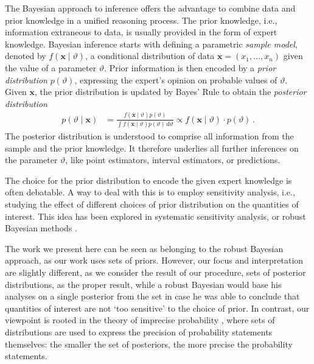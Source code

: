 \documentclass[runningheads,a4paper]{llncs}
\newcommand{\dd}{\,\mathrm{d}}
\renewcommand{\vec}[1]{{\bm #1}}
\begin{document}
The Bayesian approach to inference \cite{2007:robert,2005:ruggeri} %
offers the advantage to combine data and prior knowledge in a unified reasoning process.
The prior knowledge, i.e., information extraneous to data, is usually provided in the form of expert knowledge.
%
Bayesian inference starts with defining a parametric \emph{sample model},
denoted by $f(\vec{x} \mid \vartheta)$,
a conditional distribution of data $\vec{x} = (x_1, \ldots, x_n)$ given the value of a parameter $\vartheta$.
Prior information is then encoded by a \emph{prior distribution} $p(\vartheta)$,
expressing the expert's opinion on probable values of $\vartheta$.
Given $\vec{x}$, the prior distribution is updated by Bayes' Rule
to obtain the \emph{posterior distribution}
\begin{align}
\label{eq:bayesrule}
p(\vartheta\mid\vec{x}) &= \frac{f(\vec{x}\mid\vartheta) p(\vartheta)}{\int f(\vec{x}\mid\vartheta) p(\vartheta) \dd \vartheta}
                         \propto f(\vec{x}\mid\vartheta) \cdot p(\vartheta)\,.
\end{align}
The posterior distribution is understood to comprise all information from the sample and the prior knowledge.
It therefore underlies all further inferences on the parameter $\vartheta$,
like point estimators, interval estimators,
or predictions.

The choice for the prior distribution to encode the given expert knowledge is often debatable.
A way to deal with this is to employ sensitivity analysis,
i.e., studying the effect of different choices of prior distribution on the quantities of interest.
This idea has been explored in systematic sensitivity analysis, or robust Bayesian methods
\cite{1994:berger,2000:rios}. %

The work we present here can be seen as belonging to the robust Bayesian approach, as our work uses sets of priors.
However, our focus and interpretation are slightly different,
as we consider the result of our procedure, sets of posterior distributions, as the proper result,
while a robust Bayesian would base his analyses on a single posterior from the set
in case he was able to conclude that quantities of interest are not `too sensitive' to the choice of prior.
In contrast, our viewpoint is rooted in the theory of imprecise probability \cite{itip,1991:walley},
where sets of distributions are used to express the precision of probability statements themselves:
the smaller the set of posteriors, the more precise the probability statements.
\end{document}

